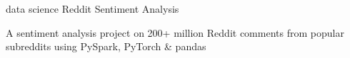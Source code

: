 
\begin{cventries}
  \cventry
    {data science} %
    {Reddit Sentiment Analysis} %
    {~} %
    {} %
    {
      \begin{cvitems} %
        \item {A sentiment analysis project on 200+ million Reddit comments from popular subreddits using PySpark, PyTorch \& pandas}
      \end{cvitems}
    }

\end{cventries}

